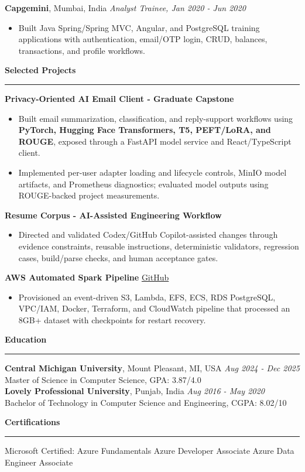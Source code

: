 \documentclass[11pt,letterpaper]{article}
\newcommand{\ressection}[1]{\Needspace{6\baselineskip}\vspace{8pt}\par\textbf{#1}\par\vspace{2pt}\hrule\vspace{5pt}}
\begin{document}
\textbf{Capgemini}, Mumbai, India \hfill \textit{Analyst Trainee, Jan 2020 - Jun 2020}
\begin{itemize}
  \item Built Java Spring/Spring MVC, Angular, and PostgreSQL training applications with authentication, email/OTP login, CRUD, balances, transactions, and profile workflows.
\end{itemize}

\ressection{Selected Projects}
\textbf{Privacy-Oriented AI Email Client - Graduate Capstone}
\begin{itemize}
  \item Built email summarization, classification, and reply-support workflows using \textbf{PyTorch, Hugging Face Transformers, T5, PEFT/LoRA, and ROUGE}, exposed through a FastAPI model service and React/TypeScript client.
  \item Implemented per-user adapter loading and lifecycle controls, MinIO model artifacts, and Prometheus diagnostics; evaluated model outputs using ROUGE-backed project measurements.
\end{itemize}
\par\vspace{2pt}
\textbf{Resume Corpus - AI-Assisted Engineering Workflow}
\begin{itemize}
  \item Directed and validated Codex/GitHub Copilot-assisted changes through evidence constraints, reusable instructions, deterministic validators, regression cases, build/parse checks, and human acceptance gates.
\end{itemize}
\par\vspace{2pt}
\textbf{AWS Automated Spark Pipeline} \hfill \href{https://github.com/preferablehuman/AWS-automated-spark-pipeline}{GitHub}
\begin{itemize}
  \item Provisioned an event-driven S3, Lambda, EFS, ECS, RDS PostgreSQL, VPC/IAM, Docker, Terraform, and CloudWatch pipeline that processed an 8GB+ dataset with checkpoints for restart recovery.
\end{itemize}

\ressection{Education}
\textbf{Central Michigan University}, Mount Pleasant, MI, USA \hfill \textit{Aug 2024 - Dec 2025}\\
Master of Science in Computer Science, GPA: 3.87/4.0\\
\textbf{Lovely Professional University}, Punjab, India \hfill \textit{Aug 2016 - May 2020}\\
Bachelor of Technology in Computer Science and Engineering, CGPA: 8.02/10

\ressection{Certifications}
Microsoft Certified: Azure Fundamentals \textbar{} Azure Developer Associate \textbar{} Azure Data Engineer Associate
\end{document}
